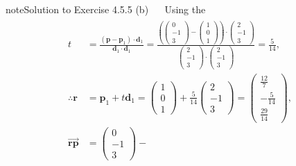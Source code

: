 \documentclass[letterpaper,10pt,english]{jupyterBook}
\begin{document}
\begin{sphinxadmonition}{note}{Solution to Exercise 4.5.5}
\sphinxAtStartPar
(b)   Using the {\hyperref[\detokenize{_pages/4.3_Shortest_distance_problems:point-line-distance-theorem}]{}}
\begin{equation*}
\begin{split} \begin{align*}
    t &= \frac{(\mathbf{p} - \mathbf{p}_1)\cdot \mathbf{d}_1}{\mathbf{d}_1 \cdot \mathbf{d}_1} = \frac{ 
    \left( \begin{pmatrix} 0 \\ -1 \\ 3 \end{pmatrix} -
    \begin{pmatrix} 1 \\ 0 \\ 1 \end{pmatrix} \right) \cdot
    \begin{pmatrix} 2 \\ -1 \\ 3 \end{pmatrix}}{
        \begin{pmatrix} 2 \\ -1 \\ 3 \end{pmatrix} \cdot
        \begin{pmatrix} 2 \\ -1 \\ 3 \end{pmatrix}
    } 
    = \frac{5}{14}, \\
    \therefore \mathbf{r} &= \mathbf{p}_1 + t\mathbf{d}_1 = \begin{pmatrix} 1 \\ 0 \\ 1 \end{pmatrix} + \frac{5}{14} 
    \begin{pmatrix} 2 \\ -1 \\ 3 \end{pmatrix} = 
    \begin{pmatrix} \frac{12}{7} \\ - \frac{5}{14} \\ \frac{29}{14} \end{pmatrix}, \\
    \overrightarrow{\mathbf{rp}} &= \begin{pmatrix} 0 \\ -1 \\ 3 \end{pmatrix} - 

\end{align*}
\end{split}
\end{equation*}
\end{sphinxadmonition}
\end{document}
